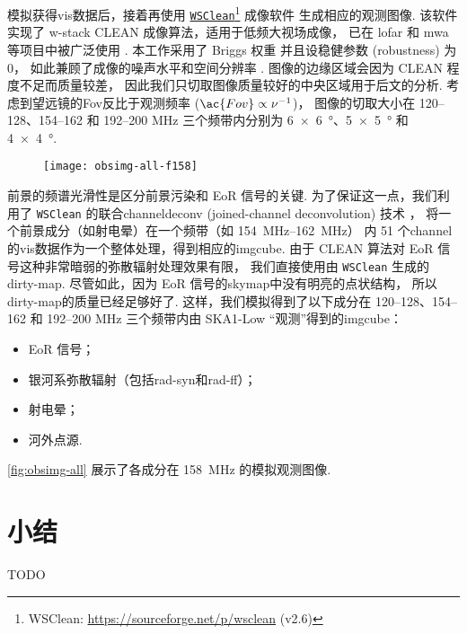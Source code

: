 模拟获得\ac{vis}数据后，接着再使用
\href{https://sourceforge.net/p/wsclean}{\texttt{WSClean}}\footnote{%
  WSClean: \url{https://sourceforge.net/p/wsclean} (v2.6)}
成像软件\cite{offringa2014}
生成相应的观测图像.
该软件实现了 \ac{w-stack} CLEAN 成像算法，适用于低频大视场成像，
已在 \ac{lofar} 和 \ac{mwa} 等项目中被广泛使用 \cite{offringa2014,offringa2017}.
本工作采用了 Briggs 权重\cite{briggs1995}
并且设稳健参数 (robustness) 为 0，
如此兼顾了成像的噪声水平和空间分辨率 \cite{briggs1995}.
图像的边缘区域会因为 CLEAN 程度不足而质量较差，
因此我们只切取图像质量较好的中央区域用于后文的分析.
考虑到望远镜的\acl{Fov}反比于观测频率 ($\ac{Fov} \propto \nu^{-1}$)，
图像的切取大小在 \numrange{120}{128}、\numrange{154}{162} 和
\numrange{192}{200} \si{\MHz} 三个频带内分别为
\SI{6 x 6}{\degree}、\SI{5 x 5}{\degree} 和 \SI{4 x 4}{\degree}.

\begin{figure}[htp]
  \centering
  \texttt{[image: obsimg-all-f158]}
  \label{fig:obsimg-all}
\end{figure}

前景的频谱光滑性是区分前景污染和 EoR 信号的关键.
为了保证这一点，我们利用了 \texttt{WSClean} 的联合\ac{channel}\ac{deconv}
(joined-channel deconvolution) 技术 \cite{offringa2017}，
将一个前景成分（如射电晕）在一个频带（如 \SIrange{154}{162}{\MHz}）
内 51 个\ac{channel}的\ac{vis}数据作为一个整体处理，得到相应的\ac{imgcube}.
由于 CLEAN 算法对 EoR 信号这种非常暗弱的弥散辐射处理效果有限，
我们直接使用由 \texttt{WSClean} 生成的\ac{dirty-map}.
尽管如此，因为 EoR 信号的\ac{skymap}中没有明亮的点状结构，
所以\ac{dirty-map}的质量已经足够好了.
这样，我们模拟得到了以下成分在 \numrange{120}{128}、\numrange{154}{162}
和 \numrange{192}{200} \si{\MHz} 三个频带内由
SKA1-Low \enquote{观测}得到的\ac{imgcube}：
\begin{itemize}
  \item EoR 信号；
  \item 银河系弥散辐射（包括\ac{rad-syn}和\ac{rad-ff}）；
  \item 射电晕；
  \item 河外点源.
\end{itemize}
\autoref{fig:obsimg-all} 展示了各成分在 \SI{158}{\MHz} 的模拟观测图像.


\section{小结}

TODO


